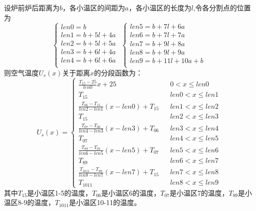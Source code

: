 \documentclass[withoutpreface,bwprint]{cumcmthesis} %
\begin{document}
	设炉前炉后距离为$b$，各小温区的间距为$a$，各小温区的长度为$l$,令各分割点的位置为
	\begin{equation}\label{wqwz}
	\begin{cases}
	len0=b\\
	len1=b+5l+4a\\
	len2=b+5l+5a\\
	len3=b+6l+4a\\
	len4=b+6l+6a\\
	\end{cases}\,\,   \begin{cases}
	len5=b+7l+6a\\
	len6=b+7l+7a\\
	len7=b+9l+8a\\
	len8=b+9l+9a\\
	len9=b+11l+10a+b\\
	\end{cases}
	\end{equation}
	则空气温度$U_s(x)$关于距离$x$的分段函数为：
	\begin{equation}\label{usx}
	U_s\left( x \right) =\left\{
	\begin{array}{lcl}
	
	\frac{T_{15}-25}{len0} x+\text{25  }& &0<x\leqslant len0\\
	
	T_{15}& &len0<x\leqslant len1\\
	
	\frac{T_{06}-T_{15}}{len2-len1}(x-len0)+T_{15}& &len1<x\leqslant len2\\
	T_{15}& &len2<x\leqslant len3\\
	
	\frac{T_{07}-T_{06}}{len4-len3}(x-len3)+T_{06}& &len3<x\leqslant len4\\
	T_{07}& &len4<x\leqslant len5\\
	
	\frac{T_{89}-T_{07}}{len6-len5}(x-len5)+T_{07}& &len5<x\leqslant len6\\
	T_{89}& &len6<x\leqslant len7\\
	
	\frac{T_{1011}-T_{89}}{len8-len7}(x-len7)+T_{15}& &len7<x\leqslant len8\\
	T_{1011}& &len8<x\leqslant len9
	\end{array} \right.
	\end{equation}
	其中$T_{15}$是小温区1-5的温度，$T_{06}$是小温区6的温度，$T_{07}$是小温区7的温度，$T_{89}$是小温区8-9的温度，$T_{1011}$是小温区10-11的温度。
	
\end{document}
